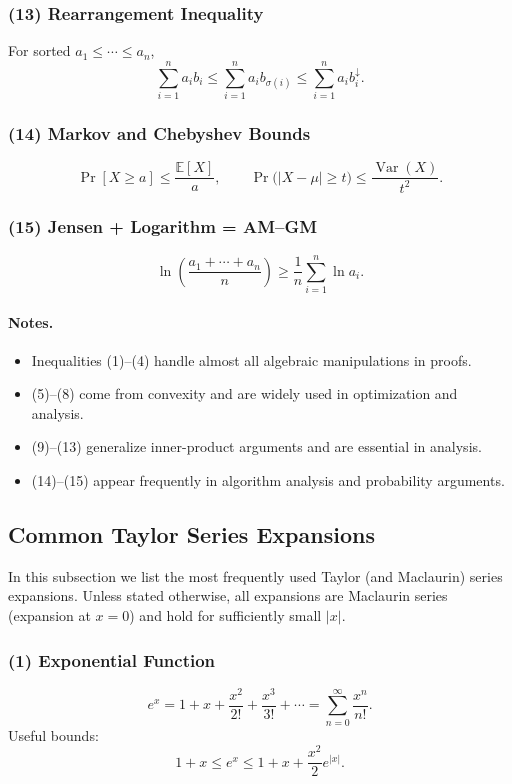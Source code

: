 \documentclass[10pt]{article}
\theoremstyle{definition}
\begin{document}
\subsubsection*{(13) Rearrangement Inequality}
For sorted \(a_1 \le \cdots \le a_n\),
\[
\sum_{i=1}^n a_i b_i
\le
\sum_{i=1}^n a_i b_{\sigma(i)}
\le
\sum_{i=1}^n a_i b_i^{\downarrow}.
\]

\subsubsection*{(14) Markov and Chebyshev Bounds}
\[
\Pr[X\ge a] \le \frac{\mathbb{E}[X]}{a},
\qquad
\Pr\big(|X-\mu|\ge t\big)\le \frac{\operatorname{Var}(X)}{t^2}.
\]

\subsubsection*{(15) Jensen + Logarithm = AM--GM}
\[
\ln\!\left(\frac{a_1+\cdots+a_n}{n}\right)
\ge
\frac{1}{n}\sum_{i=1}^n \ln a_i.
\]

\paragraph{Notes.}
\begin{itemize}
    \item Inequalities (1)--(4) handle almost all algebraic manipulations in proofs.
    \item (5)--(8) come from convexity and are widely used in optimization and analysis.
    \item (9)--(13) generalize inner-product arguments and are essential in analysis.
    \item (14)--(15) appear frequently in algorithm analysis and probability arguments.
\end{itemize}
\subsection{Common Taylor Series Expansions}

In this subsection we list the most frequently used Taylor (and Maclaurin)
series expansions.  Unless stated otherwise, all expansions are Maclaurin
series (expansion at \(x=0\)) and hold for sufficiently small \(|x|\).

\subsubsection*{(1) Exponential Function}
\[
e^x
    = 1 + x + \frac{x^2}{2!} + \frac{x^3}{3!} + \cdots
    = \sum_{n=0}^\infty \frac{x^n}{n!}.
\]
Useful bounds:
\[
1+x \le e^x \le 1 + x + \frac{x^2}{2}e^{|x|}.
\]
\end{document}
